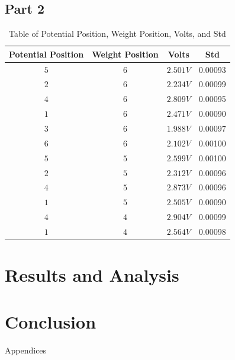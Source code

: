 \documentclass{article}
\begin{document}
\subsection{Part 2}

\begin{table}[ht]
\centering
\begin{tabular}{|c|c|c|c|}
\hline
\textbf{Potential Position} & \textbf{Weight Position} & \textbf{Volts} & \textbf{Std} \\
\hline
$5$ & $6$ & $2.501 V$ & 0.00093 \\
\hline
$2$ & $6$ & $2.234 V$ & 0.00099 \\
\hline
$4$ & $6$ & $2.809 V$ & 0.00095 \\
\hline
$1$ & $6$ & $2.471 V$ & 0.00090 \\
\hline
$3$ & $6$ & $1.988 V$ & 0.00097 \\
\hline
$6$ & $6$ & $2.102 V$ & 0.00100 \\
\hline
$5$ & $5$ & $2.599 V$ & 0.00100 \\
\hline
$2$ & $5$ & $2.312 V$ & 0.00096 \\
\hline
$4$ & $5$ & $2.873 V$ & 0.00096 \\
\hline
$1$ & $5$ & $2.505 V$ & 0.00090 \\
\hline
$4$ & $4$ & $2.904 V$ & 0.00099 \\
\hline
$1$ & $4$ & $2.564 V$ & 0.00098 \\
\hline
\end{tabular}
\caption{Table of Potential Position, Weight Position, Volts, and Std}
\label{tab:position_weight_volts_std}
\end{table}



\section{Results and Analysis}

\section{Conclusion}

\newpage
\thispagestyle{empty}  %
\begin{center}
	\vspace*{\fill}
	{\Huge Appendices}
	\vspace*{\fill}
\end{center}
\end{document}
